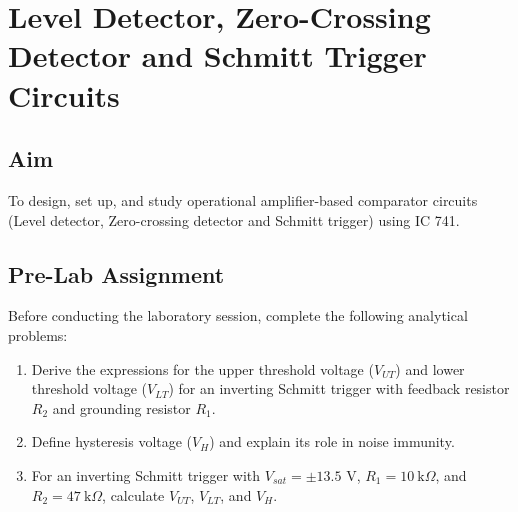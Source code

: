 
\chapter{Level Detector, Zero-Crossing Detector and Schmitt Trigger Circuits}

\section{Aim}
To design, set up, and study operational amplifier-based comparator circuits (Level detector, Zero-crossing detector and Schmitt trigger) using IC 741. %

\section{Pre-Lab Assignment}
Before conducting the laboratory session, complete the following analytical problems:
\begin{enumerate}
		\item Derive the expressions for the upper threshold voltage ($V_{UT}$) and lower threshold voltage ($V_{LT}$) for an inverting Schmitt trigger with feedback resistor $R_2$ and grounding resistor $R_1$.
	\item Define hysteresis voltage ($V_H$) and explain its role in noise immunity.
	\item For an inverting Schmitt trigger with $V_{sat} = \pm 13.5\text{ V}$, $R_1 = \SI{10}{\kilo\Omega}$, and $R_2 = \SI{47}{\kilo\Omega}$, calculate $V_{UT}$, $V_{LT}$, and $V_H$.
\end{enumerate}

